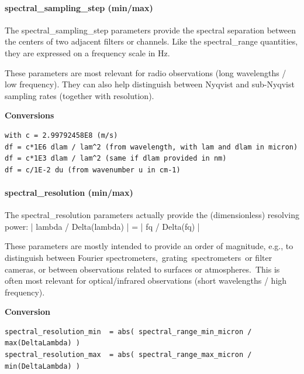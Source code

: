 \documentclass[11pt,a4paper]{ivoa}
\begin{document}
\paragraph{spectral\_sampling\_step (min/max)}

The spectral\_sampling\_step parameters provide the spectral separation between the centers of two adjacent filters or channels. Like the spectral\_range quantities, they are expressed on a frequency scale in Hz. 

These parameters are most relevant for radio observations (long wavelengths / low frequency). They can also help distinguish between Nyqvist and sub-Nyqvist sampling rates (together with resolution).





\textbf{Conversions}




\begin{verbatim}
with c = 2.99792458E8 (m/s)
df = c*1E6 dlam / lam^2 (from wavelength, with lam and dlam in micron)
df = c*1E3 dlam / lam^2 (same if dlam provided in nm)
df = c/1E-2 du (from wavenumber u in cm-1)
\end{verbatim}




\paragraph{spectral\_resolution (min/max)}

The spectral\_resolution parameters actually provide the (dimensionless) resolving power: | lambda / Delta(lambda) | = | fq / Delta(fq) |  

These parameters are mostly intended to provide an order of magnitude, e.g., to distinguish between Fourier spectrometers, grating spectrometers or filter cameras, or between observations related to surfaces or atmospheres. This is often most relevant for optical/infrared observations (short wavelengths / high frequency).





\textbf{Conversion}




\begin{verbatim}
spectral_resolution_min  = abs( spectral_range_min_micron / max(DeltaLambda) )
spectral_resolution_max  = abs( spectral_range_max_micron / min(DeltaLambda) )
\end{verbatim}
\end{document}
